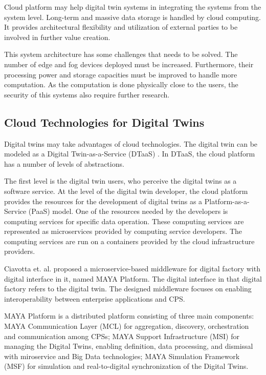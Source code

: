 \documentclass[article]{aaltoseries}
\begin{document}
Cloud platform may help digital twin systems in integrating the systems from the system level. Long-term and massive data storage is handled by cloud computing. It provides architectural flexibility and utilization of external parties to be involved in further value creation.

This system architecture has some challenges that needs to be solved. The number of edge and fog devices deployed must be increased. Furthermore, their processing power and storage capacities must be improved to handle more computation. As the computation is done physically close to the users, the security of this systems also require further research.

\subsection{Cloud Technologies for Digital Twins}
Digital twins may take advantages of cloud technologies. The digital twin can be modeled as a Digital Twin-as-a-Service (DTaaS) \cite{borodulin2017towards}. In DTaaS, the cloud platform has a number of levels of abstractions. 

The first level is the digital twin users, who perceive the digital twins as a software service. At the level of the digital twin developer, the cloud platform provides the resources for the development of digital twins as a Platform-as-a-Service (PaaS) model. One of the resources needed by the developers is computing services for specific data operation. These computing services are represented as microservices provided by computing service developers. The computing services are run on a containers provided by the cloud infrastructure providers.

Ciavotta et. al. \cite{ciavotta2017microservice} proposed a microservice-based middleware for digital factory with digital interface in it, named MAYA Platform. The digital interface in that digital factory refers to the digital twin. The designed middleware focuses on enabling interoperability between enterprise applications and CPS.

MAYA Platform is a distributed platform consisting of three main components: MAYA Communication Layer (MCL) for aggregation, discovery, orchestration and communication among CPSs; MAYA Support Infrastructure (MSI) for managing the Digital Twins, enabling definition, data processing, and dismissal with miroservice and Big Data technologies; MAYA Simulation Framework (MSF) for simulation and real-to-digital synchronization of the Digital Twins.
\end{document}
